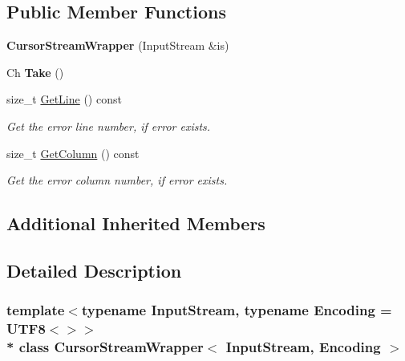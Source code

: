\subsection*{Public Member Functions}
\begin{DoxyCompactItemize}
\item 
{\bfseries Cursor\+Stream\+Wrapper} (Input\+Stream \&is)\hypertarget{classCursorStreamWrapper_a8d9a0109e19ab4fb7a79091cefe608a7}{}\label{classCursorStreamWrapper_a8d9a0109e19ab4fb7a79091cefe608a7}

\item 
Ch {\bfseries Take} ()\hypertarget{classCursorStreamWrapper_af0bbad24ff7ad101cdf9842760deb0f6}{}\label{classCursorStreamWrapper_af0bbad24ff7ad101cdf9842760deb0f6}

\item 
size\+\_\+t \hyperlink{classCursorStreamWrapper_ae78cc02ed7308771a57ee2b858925b36}{Get\+Line} () const \hypertarget{classCursorStreamWrapper_ae78cc02ed7308771a57ee2b858925b36}{}\label{classCursorStreamWrapper_ae78cc02ed7308771a57ee2b858925b36}

\begin{DoxyCompactList}\small\item\em Get the error line number, if error exists. \end{DoxyCompactList}\item 
size\+\_\+t \hyperlink{classCursorStreamWrapper_a8e2764dc2434acb4bba99cf233206247}{Get\+Column} () const \hypertarget{classCursorStreamWrapper_a8e2764dc2434acb4bba99cf233206247}{}\label{classCursorStreamWrapper_a8e2764dc2434acb4bba99cf233206247}

\begin{DoxyCompactList}\small\item\em Get the error column number, if error exists. \end{DoxyCompactList}\end{DoxyCompactItemize}
\subsection*{Additional Inherited Members}


\subsection{Detailed Description}
\subsubsection*{template$<$typename Input\+Stream, typename Encoding = U\+T\+F8$<$$>$$>$\\*
class Cursor\+Stream\+Wrapper$<$ Input\+Stream, Encoding $>$}

